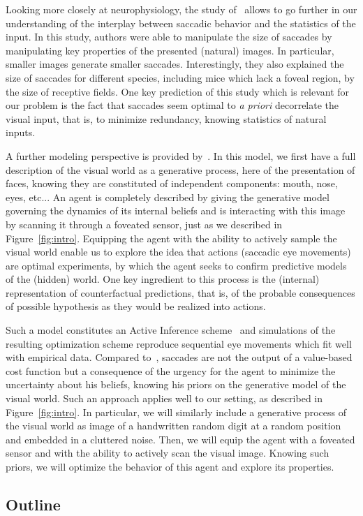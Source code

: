 Looking more closely at neurophysiology, the study of~\citep{Samonds18} allows to go further in our understanding of the interplay between saccadic behavior and the statistics of the input. In this study, authors were able to manipulate the size of saccades by manipulating key properties of the presented (natural) images. In particular, smaller images generate smaller saccades. Interestingly, they also explained the size of saccades for different species, including mice which lack a foveal region, by the size of receptive fields. One key prediction of this study which is relevant for our problem is the fact that saccades seem optimal to \emph{a priori} decorrelate the visual input, that is, to minimize redundancy, knowing statistics of natural inputs.

A further modeling perspective is provided by~\citep{Friston12}. In this model, we first have a full description of the visual world as a generative process, here of the presentation of faces, knowing they are constituted of independent components: mouth, nose, eyes, etc... An agent is completely described by giving the generative model governing the dynamics of its internal beliefs and is interacting with this image by scanning it through a foveated sensor, just as we described in Figure~\ref{fig:intro}. Equipping the agent with the ability to actively sample the visual world enable us to explore the idea that actions (saccadic eye movements) are optimal experiments, by which the agent seeks to confirm predictive models of the (hidden) world. One key ingredient to this process is the (internal) representation of counterfactual predictions, that is, of the probable consequences of possible hypothesis as they would be realized into actions.

Such a model constitutes an Active Inference scheme~\citep{Mirza18} and simulations of the resulting optimization scheme reproduce sequential eye movements which fit well with empirical data. Compared to~\citet{Najemnik05}, saccades are not the output of a value-based cost function but a consequence of the urgency for the agent to minimize the uncertainty about his beliefs, knowing his priors on the generative model of the visual world. Such an approach applies well to our setting, as described in Figure~\ref{fig:intro}. In particular, we will similarly include a generative process of the visual world as image of a handwritten random digit at a random position and embedded in a cluttered noise. Then, we will equip the agent with a foveated sensor and with the ability to actively scan the visual image. Knowing such priors, we will optimize the behavior of this agent and explore its properties.

\subsection{Outline}


